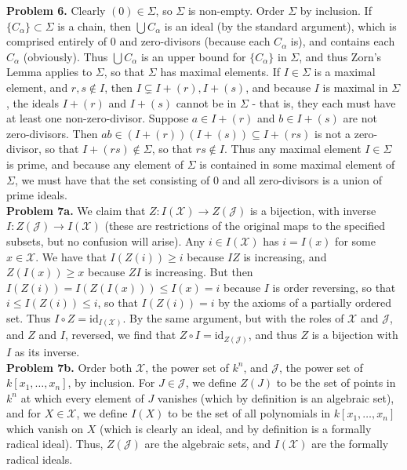 \documentclass[11pt]{article}
\newcommand{\num}[1]{\noindent \textbf{#1}}
\theoremstyle{definition}
\begin{document}
\num{Problem 6.} Clearly $(0)\in\Sigma$, so $\Sigma$ is non-empty. Order
$\Sigma$ by inclusion. If $\{C_\alpha\}\subset\Sigma$ is a chain, then
$\bigcup C_\alpha$ is an ideal (by the standard argument), which is comprised
entirely of 0 and zero-divisors (because each $C_\alpha$ is), and contains
each $C_\alpha$ (obviously). Thus $\bigcup C_\alpha$ is an upper bound for
$\{C_\alpha\}$ in $\Sigma$, and thus Zorn's Lemma applies to $\Sigma$, so
that $\Sigma$ has maximal elements. If $I\in\Sigma$ is a maximal element, and
$r,s\notin I$, then $I\subsetneq I+(r), I+(s)$, and because $I$ is maximal
in $\Sigma$, the ideals $I+(r)$ and $I+(s)$ cannot be in $\Sigma$ - that
is, they each must have at least one non-zero-divisor. Suppose $a\in I+(r)$
and $b\in I+(s)$ are not zero-divisors. Then $ab\in (I+(r))(I+(s))\subseteq
I+(rs)$ is not a zero-divisor, so that $I+(rs)\notin\Sigma$, so that $rs\notin
I$. Thus any maximal element $I\in\Sigma$ is prime, and because any element of
$\Sigma$ is contained in some maximal element of $\Sigma$, we must have that
the set consisting of 0 and all zero-divisors is a union of prime ideals.   \\

\num{Problem 7a.}  We claim that $Z:I(\mathcal{X})\rightarrow Z(\mathcal{J})$
is a bijection, with inverse $I:Z(\mathcal{J})\rightarrow I(\mathcal{X})$
(these are restrictions of the original maps to the specified subsets, but
no confusion will arise). Any $i\in I(\mathcal{X})$ has $i=I(x)$ for some
$x\in\mathcal{X}$. We have that $I(Z(i))\geq i$ because $IZ$ is increasing, and
$Z(I(x))\geq x$ because $ZI$ is increasing. But then $I(Z(i))= I(Z(I(x)))\leq
I(x) = i$ because $I$ is order reversing, so that $i\leq I(Z(i))\leq i$,
so that $I(Z(i))=i$ by the axioms of a partially ordered set. Thus $I\circ
Z = \text{id}_{I(\mathcal{X})}$. By the same argument, but with the roles
of $\mathcal{X}$ and $\mathcal{J}$, and $Z$ and $I$, reversed, we find that
$Z\circ I = \text{id}_{Z(\mathcal{J})}$, and thus $Z$ is a bijection with $I$
as its inverse.\\

\num{Problem 7b.} Order both $\mathcal{X}$, the power set of $k^n$, and
$\mathcal{J}$, the power set of $k[x_1,\ldots,x_n]$, by inclusion. For
$J\in\mathcal{J}$, we define $Z(J)$ to be the set of points in $k^n$ at which
every element of $J$ vanishes (which by definition is an algebraic set),
and for $X\in\mathcal{X}$, we define $I(X)$ to be the set of all polynomials
in $k[x_1,\ldots,x_n]$ which vanish on $X$ (which is clearly an ideal, and
by definition is a formally radical ideal). Thus, $Z(\mathcal{J})$ are the
algebraic sets, and $I(\mathcal{X})$ are the formally radical ideals. \\
\end{document}
